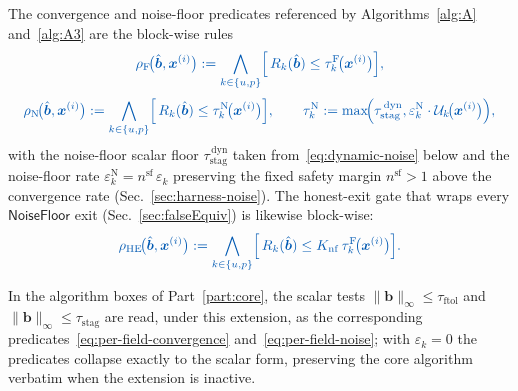 \documentclass{article}
\newcommand{\textftol}{\tau_{\mathrm{ftol}}}
\newcommand{\textstag}{\tau_{\mathrm{stag}}}
\newcommand{\extline}[1]{{\color{extcolor}#1}}
\begin{document}
\extline{The convergence and noise-floor predicates referenced by
Algorithms~\ref{alg:A} and~\ref{alg:A3} are the block-wise rules}
\begin{equation}
    \label{eq:per-field-convergence}
    \textcolor{extcolor}{
    \rho_{\mathrm{F}}\!\bigl(\hat{\boldsymbol{b}}, \boldsymbol{x}^{(i)}\bigr)
        := \bigwedge_{k \in \{u,p\}}
            \Bigl[\,R_{k}(\hat{\boldsymbol{b}})
                \le \tau^{\mathrm{F}}_{k}\!\bigl(\boldsymbol{x}^{(i)}\bigr)\Bigr],
    }
\end{equation}
\begin{equation}
    \label{eq:per-field-noise}
    \textcolor{extcolor}{
    \rho_{\mathrm{N}}\!\bigl(\hat{\boldsymbol{b}}, \boldsymbol{x}^{(i)}\bigr)
        := \bigwedge_{k \in \{u,p\}}
            \Bigl[\,R_{k}(\hat{\boldsymbol{b}})
                \le \tau^{\mathrm{N}}_{k}\!\bigl(\boldsymbol{x}^{(i)}\bigr)\Bigr],
        \qquad \tau^{\mathrm{N}}_{k} := \max\!\Bigl(\textstag^{\,\mathrm{dyn}},
        \varepsilon_{k}^{\mathrm{N}} \cdot \mathcal{U}_{k}\!\bigl(\boldsymbol{x}^{(i)}\bigr)\Bigr),}
\end{equation}
\extline{with the noise-floor scalar floor $\textstag^{\,\mathrm{dyn}}$
taken from~\eqref{eq:dynamic-noise} below and the noise-floor rate
$\varepsilon_{k}^{\mathrm{N}} = n^{\mathrm{sf}}\,\varepsilon_{k}$
preserving the fixed safety margin $n^{\mathrm{sf}} > 1$ above the
convergence rate (Sec.~\ref{sec:harness-noise}). The honest-exit
gate that wraps every $\mathsf{NoiseFloor}$ exit
(Sec.~\ref{sec:falseEquiv}) is likewise block-wise:}
\begin{equation}
    \label{eq:per-field-honest}
    \textcolor{extcolor}{
    \rho_{\mathrm{HE}}\!\bigl(\hat{\boldsymbol{b}}, \boldsymbol{x}^{(i)}\bigr)
        := \bigwedge_{k \in \{u,p\}}
            \Bigl[\,R_{k}(\hat{\boldsymbol{b}})
                \le K_{\mathrm{nf}}\, \tau^{\mathrm{F}}_{k}\!\bigl(\boldsymbol{x}^{(i)}\bigr)\Bigr].}
\end{equation}

\extline{In the algorithm boxes of Part~\ref{part:core}, the scalar
tests $\|\boldsymbol{b}\|_{\infty}\le \textftol$ and
$\|\boldsymbol{b}\|_{\infty}\le \textstag$ are read, under this
extension, as the corresponding predicates~\eqref{eq:per-field-convergence}
and~\eqref{eq:per-field-noise}; with $\varepsilon_{k} = 0$ the
predicates collapse exactly to the scalar form, preserving the core
algorithm verbatim when the extension is inactive.}
\end{document}

